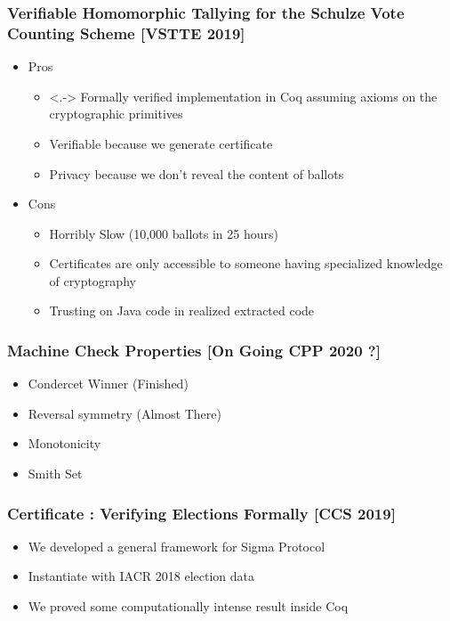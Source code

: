\documentclass{beamer}
\begin{document}
\begin{frame}
\frametitle{Verifiable Homomorphic Tallying for the Schulze Vote Counting Scheme [VSTTE 2019]}
\begin{itemize}[<+->]
\item Pros 
\begin{itemize}
\item<.-> Formally verified implementation in Coq assuming axioms on 
          the cryptographic primitives 
\item Verifiable because we generate certificate 
\item Privacy because we don't reveal the content of ballots
\end{itemize}
\item Cons
\begin{itemize}
\item Horribly Slow (10,000 ballots in 25 hours)
\item Certificates are only accessible to someone having specialized 
	  knowledge of cryptography
\item Trusting on Java code in realized extracted code
\end{itemize}
\end{itemize}
\end{frame}


\begin{frame}
\frametitle{Machine Check Properties [On Going CPP 2020 ?]}
\begin{itemize}
\item Condercet Winner (Finished)
\item Reversal symmetry (Almost There)
\item Monotonicity
\item Smith Set
\end{itemize}
\end{frame}

\begin{frame}
\frametitle{Certificate : Verifying Elections Formally [CCS 2019]}
\begin{itemize}
\item We developed a general framework for Sigma Protocol
\item Instantiate with IACR 2018 election data
\item We proved some computationally intense result inside 
      Coq
\end{itemize}
\end{frame}
\end{document}
